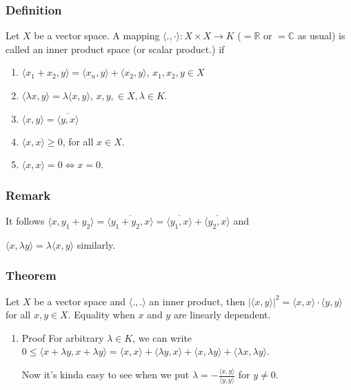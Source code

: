 \documentclass[11pt]{article}
\def\R{\mathbb{R}}
\def\C{\mathbb{C}}
\begin{document}
\subsubsection{Definition}
\label{sec:org951a6bf}
Let \(X\) be a vector space. A mapping \(\langle ., \cdot \rangle \colon X
    \times X \rightarrow K\) (\(=\R\) or \(=\C\) as usual) is called an inner product
space (or scalar product.) if 
\begin{enumerate}
\item \(\langle x_1 + x_2 , y \rangle = \langle x_n , y \rangle + \langle x_2, y\rangle\), \(x_1, x_2, y \in X\)
\item \(\langle \lambda x, y \rangle = \lambda \langle x, y \rangle\), \(x, y, \in X, \lambda \in K\).
\item \(\langle x, y\rangle = \overline{\langle y, x \rangle}\)
\item \(\langle x, x \rangle \ge 0\), for all \(x\in X\).
\item \(\langle x, x \rangle = 0 \iff x = 0\).
\end{enumerate}
\subsubsection{Remark}
\label{sec:org4920318}
It follows \(\langle x, y_1 + y_2 \rangle = \overline{\langle y_1 + y_2, x
    \rangle} = \overline{\langle y_1, x\rangle} + \overline{\langle y_2,
    x\rangle}\) and

\(\langle x, \lambda y\rangle = \lambda \langle x, y\rangle\) similarly.
\subsubsection{Theorem}
\label{sec:orge4de91c}
Let \(X\) be a vector space and \(\langle . , . \rangle\) an inner product, then
\(\vert \langle x, y \rangle\vert^2 = \langle x, x \rangle \cdot \langle y, y
    \rangle\) for all \(x, y \in X\). Equality when \(x\) and \(y\) are linearly
dependent.
\begin{enumerate}
\item Proof
\label{sec:org4fbd4bf}
For arbitrary \(\lambda \in K\), we can write \(0 \le \langle x + \lambda y,
     x + \lambda y \rangle = \langle x, x \rangle + \langle \lambda y, x
     \rangle + \langle x, \lambda y \rangle + \langle \lambda x, \lambda y
     \rangle\).

Now it's kinda easy to see when we put \(\lambda = -\frac{\langle x, y
     \rangle}{\langle y, y \rangle}\) for \(y \neq 0\).
\end{enumerate}
\end{document}
